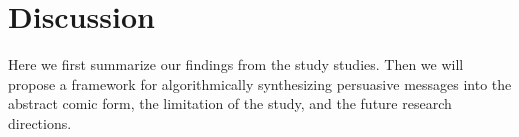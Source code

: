 \section{Discussion}
\label{sec:Discussion}
Here we first summarize our findings from the study studies. Then we will propose a framework for algorithmically synthesizing persuasive messages into the abstract comic form, the limitation of the study, and the future research directions. 


